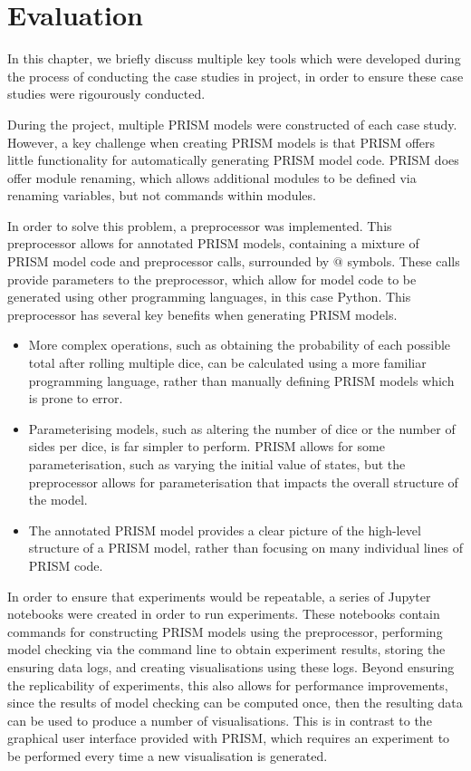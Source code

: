 \chapter{Evaluation} 
\label{evaluation}

In this chapter, we briefly discuss multiple key tools which were developed during the process of conducting the case studies in project, in order to ensure these case studies were rigourously conducted.

During the project, multiple PRISM models were constructed of each case study. However, a key challenge when creating PRISM models is that PRISM offers little functionality for automatically generating PRISM model code. PRISM does offer module renaming, which allows additional modules to be defined via renaming variables, but not commands within modules.

In order to solve this problem, a preprocessor was implemented. This preprocessor allows for annotated PRISM models, containing a mixture of PRISM model code and preprocessor calls, surrounded by $@$ symbols. These calls provide parameters to the preprocessor, which allow for model code to be generated using other programming languages, in this case Python. This preprocessor has several key benefits when generating PRISM models.

\begin{itemize}
    \item More complex operations, such as obtaining the probability of each possible total after rolling multiple dice, can be calculated using a more familiar programming language, rather than manually defining PRISM models which is prone to error.
    \item Parameterising models, such as altering the number of dice or the number of sides per dice, is far simpler to perform. PRISM allows for some parameterisation, such as varying the initial value of states, but the preprocessor allows for parameterisation that impacts the overall structure of the model.
    \item The annotated PRISM model provides a clear picture of the high-level structure of a PRISM model, rather than focusing on many individual lines of PRISM code.
\end{itemize}

In order to ensure that experiments would be repeatable, a series of Jupyter notebooks were created in order to run experiments. These notebooks contain commands for constructing PRISM models using the preprocessor, performing model checking via the command line to obtain experiment results, storing the ensuring data logs, and creating visualisations using these logs. Beyond ensuring the replicability of experiments, this also allows for performance improvements, since the results of model checking can be computed once, then the resulting data can be used to produce a number of visualisations. This is in contrast to the graphical user interface provided with PRISM, which requires an experiment to be performed every time a new visualisation is generated.

